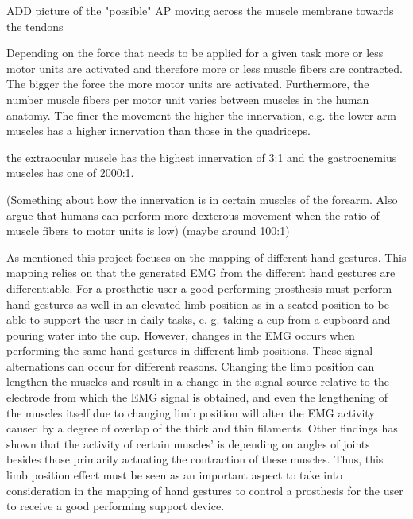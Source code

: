 
ADD picture of the "possible" AP moving across the muscle membrane towards the tendons

Depending on the force that needs to be applied for a given task more or less motor units are activated and therefore more or less muscle fibers are contracted. The bigger the force the more motor units are activated. Furthermore, the number muscle fibers per motor unit varies between muscles in the human anatomy. The finer the movement the higher the innervation, e.g. the lower arm muscles has a higher innervation than those in the quadriceps. \cite{cram2012}

the extraocular muscle has the highest innervation of 3:1 and the gastrocnemius muscles has one of 2000:1. \cite{cram2012}

(Something about how the innervation is in certain muscles of the forearm. Also argue that humans can perform more dexterous movement when the ratio of muscle fibers to motor units is low) (maybe around 100:1)

As mentioned this project focuses on the mapping of different hand gestures. This mapping relies on that the generated EMG from the different hand gestures are differentiable. For a prosthetic user a good performing prosthesis must perform hand gestures as well in an elevated limb position as in a seated position to be able to support the user in daily tasks, e. g. taking a cup from a cupboard and pouring water into the cup. However, changes in the EMG occurs when performing the same hand gestures in different limb positions. These signal alternations can occur for different reasons. Changing the limb position can lengthen the muscles and result in a change in the signal source relative to the electrode from which the EMG signal is obtained, and even the lengthening of the muscles itself due to changing limb position will alter the EMG activity caused by a degree of overlap of the thick and thin filaments. Other findings has shown that the activity of certain muscles' is depending on angles of joints besides those primarily actuating the contraction of these muscles. Thus, this limb position effect must be seen as an important aspect to take into consideration in the mapping of hand gestures to control a prosthesis for the user to receive a good performing support device.